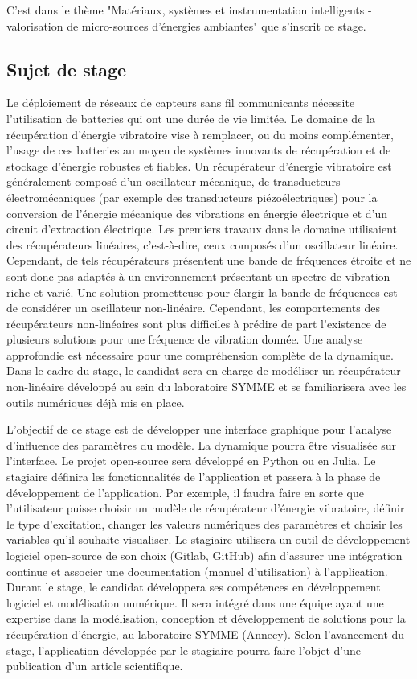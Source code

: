 \documentclass[a4paper, french, 12pt, titlepage]{article}
\begin{document}
C'est dans le thème "Matériaux, systèmes et instrumentation intelligents - valorisation de micro-sources d'énergies ambiantes" que s'inscrit ce stage. 

\subsection{Sujet de stage}

Le déploiement de réseaux de capteurs sans fil communicants nécessite l’utilisation de batteries qui ont une durée de vie limitée. Le domaine de la récupération d’énergie vibratoire vise à remplacer, ou du moins complémenter, l’usage de ces batteries au moyen de systèmes innovants de récupération et de stockage d’énergie robustes et fiables. Un récupérateur d’énergie vibratoire est généralement composé d’un oscillateur mécanique, de transducteurs électromécaniques (par exemple des transducteurs piézoélectriques) pour la conversion de l’énergie mécanique des vibrations en énergie électrique et d’un circuit d’extraction électrique. Les premiers travaux dans le domaine utilisaient des récupérateurs linéaires, c’est-à-dire, ceux composés d’un oscillateur linéaire. Cependant, de tels récupérateurs présentent une bande de fréquences étroite et ne sont donc pas adaptés à un environnement présentant un spectre de vibration riche et varié. Une solution prometteuse pour élargir la bande de fréquences est de considérer un oscillateur non-linéaire. Cependant, les comportements des récupérateurs non-linéaires sont plus difficiles à prédire de part l’existence de plusieurs solutions pour une fréquence de vibration donnée. Une analyse approfondie est nécessaire pour une compréhension complète de la dynamique. Dans le cadre du stage, le candidat sera en charge de modéliser un récupérateur non-linéaire développé au sein du laboratoire SYMME et se familiarisera avec les outils numériques déjà mis en place.

L’objectif de ce stage est de développer une interface graphique pour l'analyse d'influence des paramètres du modèle. La dynamique pourra être visualisée sur l’interface. Le projet open-source sera développé en Python ou en Julia. Le stagiaire définira les fonctionnalités de l’application et passera à la phase de développement de l’application. Par exemple, il faudra faire en sorte que l’utilisateur puisse choisir un modèle de récupérateur d’énergie vibratoire, définir le type d’excitation, changer les valeurs numériques des paramètres et choisir les variables qu’il souhaite visualiser. Le stagiaire utilisera un outil de développement logiciel open-source de son choix (Gitlab, GitHub) afin d’assurer une intégration continue et associer une documentation (manuel d’utilisation) à l’application. Durant le stage, le candidat développera ses compétences en développement logiciel et modélisation numérique. Il sera intégré dans une équipe ayant une expertise dans la modélisation, conception et développement de solutions pour la récupération d’énergie, au laboratoire SYMME (Annecy). Selon l’avancement du stage, l’application développée par le stagiaire pourra faire l’objet d’une publication d’un article scientifique.
\end{document}
